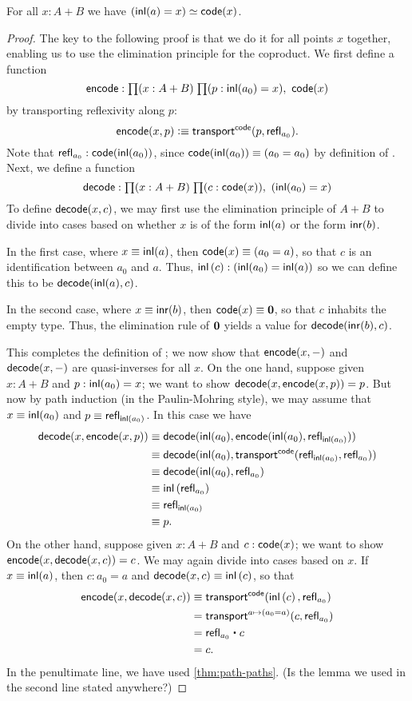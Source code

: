 \begin{thm}\label{thm:path-coprod}
  For all $x:A+B$ we have $(\mathsf{inl}(a)=x) \simeq \mathsf{code}(x)$.
\end{thm}
\begin{proof}
  The key to the following proof is that we do it for all points $x$ together, enabling us to use the elimination principle for the coproduct.
  We first define a function
  \[ \encode : \prd{x:A+B}{p:\inl(a_0)=x} \code(x) \]
  by transporting reflexivity along $p$:
  \[ \mathsf{encode}(x,p) \vcentcolon\equiv \mathsf{transport}^{\mathsf{code}}(p,\mathsf{refl}_{a_0}). \]
  Note that $\mathsf{refl}_{a_0} : \mathsf{code}(\mathsf{inl}(a_0))$, since $\mathsf{code}(\mathsf{inl}(a_0))\equiv (a_0=a_0)$ by definition of \code.
  Next, we define a function
  \[ \decode : \prd{x:A+B}{c:\code(x)} (\inl(a_0)=x) \]
  To define $\mathsf{decode}(x,c)$, we may first use the elimination principle of $A+B$ to divide into cases based on whether $x$ is of the form $\mathsf{inl}(a)$ or the form $\mathsf{inr}(b)$.

  In the first case, where $x\equiv \mathsf{inl}(a)$, then $\mathsf{code}(x)\equiv (a_0=a)$, so that $c$ is an identification between $a_0$ and $a$.
  Thus, ${\mathsf{inl}}\left({c}\right):(\mathsf{inl}(a_0)=\mathsf{inl}(a))$ so we can define this to be $\mathsf{decode}(\mathsf{inl}(a),c)$.

  In the second case, where $x\equiv \mathsf{inr}(b)$, then $\mathsf{code}(x)\equiv \mathbf{0}$, so that $c$ inhabits the empty type.
  Thus, the elimination rule of $\mathbf{0}$ yields a value for $\mathsf{decode}(\mathsf{inr}(b),c)$.

  This completes the definition of \decode; we now show that $\mathsf{encode}(x,-)$ and $\mathsf{decode}(x,-)$ are quasi-inverses for all $x$.
  On the one hand, suppose given $x:A+B$ and $p:\mathsf{inl}(a_0)=x$; we want to show $\mathsf{decode}(x,\mathsf{encode}(x,p))=p$.
  But now by path induction (in the Paulin-Mohring style), we may assume that $x\equiv\mathsf{inl}(a_0)$ and $p\equiv \mathsf{refl}_{\mathsf{inl}(a_0)}$.
  In this case we have
  \begin{align*}
    \mathsf{decode}(x,\mathsf{encode}(x,p))
    &\equiv \mathsf{decode}(\mathsf{inl}(a_0),\mathsf{encode}(\mathsf{inl}(a_0),\mathsf{refl}_{\mathsf{inl}(a_0)}))\\
    &\equiv \mathsf{decode}(\mathsf{inl}(a_0),\mathsf{transport}^{\mathsf{code}}(\mathsf{refl}_{\mathsf{inl}(a_0)},\mathsf{refl}_{a_0}))\\
    &\equiv \mathsf{decode}(\mathsf{inl}(a_0),\mathsf{refl}_{a_0})\\
    &\equiv {\ensuremath{\mathsf{inl}}}\left({\mathsf{refl}_{a_0}}\right)\\
    &\equiv \mathsf{refl}_{\mathsf{inl}(a_0)}\\
    &\equiv p.
  \end{align*}
  On the other hand, suppose given $x:A+B$ and $c:\mathsf{code}(x)$; we want to show $\mathsf{encode}(x,\mathsf{decode}(x,c))=c$.
  We may again divide into cases based on $x$.
  If $x\equiv\mathsf{inl}(a)$, then $c:a_0=a$ and $\mathsf{decode}(x,c)\equiv {\ensuremath{\mathsf{inl}}}\left({c}\right)$, so that
  \begin{align*}
    \encode(x,\decode(x,c))
    &\jdeq \transfib{\code}{\ap{\inl}{c}}{\refl{a_0}}\\
    &= \transfib{a\mapsto (a_0=a)}{c}{\refl{a_0}}\\
    &= \refl{a_0} \ct c\\
    &= c.
  \end{align*}
  In the penultimate line, we have used \autoref{thm:path-paths}.
  (Is the lemma we used in the second line stated anywhere?)
\end{proof}

